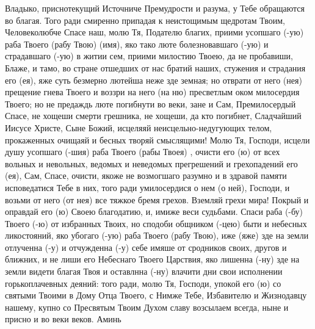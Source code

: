 \begin{mymulticols}
Владыко, приснотекущий Источниче Премудрости и разума, у Тебе обращаются во благая. Того ради смиренно припадая к неистощимым щедротам Твоим, Человеколюбче Спасе наш, молю Тя, Подателю благих, приими усопшаго (-ую) раба Твоего (рабу Твою) (имя), яко тако люте болезновавшаго (-ую) и страдавшаго (-ую) в житии сем, приими милостию Твоею, да не пробавиши, Блаже, и тамо, во стране отшедших от нас братий наших, стужения и страдания его (ея), яже суть безмерно лютейша неже зде земная; но отврати от него (нея) прещение гнева Твоего и воззри на него (на ню) пресветлым оком милосердия Твоего; но не предаждь люте погибнути во веки, зане и Сам, Премилосердый Спасе, не хощеши смерти грешника, не хощеши, да кто погибнет, Сладчайший Иисусе Христе, Сыне Божий, исцеляяй неисцельно-недугующих телом, прокаженных очищаяй и бесных творяй смыслящими! Молю Тя, Господи, исцели душу усопшаго (-шия) раба Твоего (рабы Твоея) , очисти его (ю) от всех вольных и невольных, ведомых и неведомых прегрешений и грехопадений его (ея), Сам, Спасе, очисти, якоже не возмогшаго разумно и в здравой памяти исповедатися Тебе в них, того ради умилосердися о нем (о ней), Господи, и возьми от него (от нея) все тяжкое бремя грехов. Вземляй грехи мира! Покрый и оправдай его (ю) Своею благодатию, и, имиже веси судьбами. Спаси раба (-бу) Твоего (-ю) от избранных Твоих, но сподоби общником (-цею) быти и небесных ликостояний, яко убогаго (-ую) раба Твоего (рабу Твою), иже (яже) зде на земли отлученна (-у) и отчужденна (-у) себе имяше от сродников своих, другов и ближних, и не лиши его Небеснаго Твоего Царствия, яко лишенна (-ну) зде на земли видети благая Твоя и оставлнна (-ну) влачити дни свои исполнении горькоплачевных деяний: того ради, молю Тя, Господи, упокой его (ю) со святыми Твоими в Дому Отца Твоего, с Нимже Тебе, Избавителю и Жизнодавцу нашему, купно со Пресвятым Твоим Духом славу возсылаем всегда, ныне и присно и во веки веков. Аминь

\end{mymulticols}

\mychapterending

